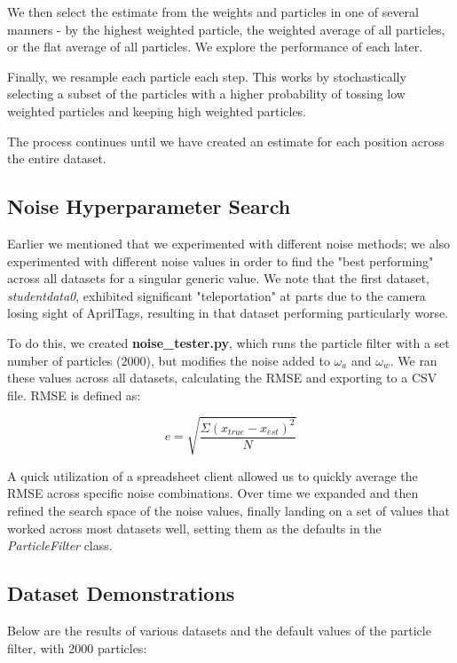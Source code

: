 \documentclass{article}
\begin{document}
We then select the estimate from the weights and particles in one of several manners - by the highest weighted particle, the weighted average of all particles, or the flat average of all particles. We explore the performance of each later.

Finally, we resample each particle each step. This works by stochastically selecting a subset of the particles with a higher probability of tossing low weighted particles and keeping high weighted particles.

The process continues until we have created an estimate for each position across the entire dataset.

\subsection*{Noise Hyperparameter Search}

Earlier we mentioned that we experimented with different noise methods; we also experimented with different noise values in order to find the "best performing" across all datasets for a singular generic value. We note that the first dataset, \textit{studentdata0}, exhibited significant "teleportation" at parts due to the camera losing sight of AprilTags, resulting in that dataset performing particularly worse.

To do this, we created \textbf{noise\_tester.py}, which runs the particle filter with a set number of particles ($2000$), but modifies the noise added to $\omega_a$ and $\omega_w$. We ran these values across all datasets, calculating the RMSE and exporting to a CSV file. RMSE is defined as:

\begin{equation}
    e = \sqrt{\frac{\Sigma (x_{true} - x_{est})^2}{N}}
\end{equation}

A quick utilization of a spreadsheet client allowed us to quickly average the RMSE across specific noise combinations. Over time we expanded and then refined the search space of the noise values, finally landing on a set of values that worked across most datasets well, setting them as the defaults in the \textit{ParticleFilter} class.

\subsection*{Dataset Demonstrations}

Below are the results of various datasets and the default values of the particle filter, with 2000 particles:
\end{document}
